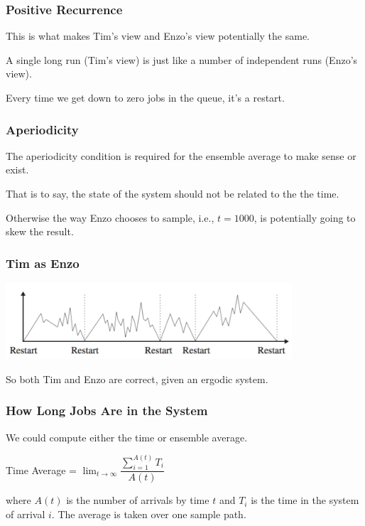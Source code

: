 \begin{frame}
\frametitle{Positive Recurrence}

This is what makes Tim's view and Enzo's view potentially the same. 

A single long run (Tim's view) is just like a number of independent runs (Enzo's view). 

Every time we get down to zero jobs in the queue, it's a restart. 

\end{frame}



\begin{frame}
\frametitle{Aperiodicity}

The \alert{aperiodicity} condition is required for the ensemble average to make sense or exist. 

That is to say, the state of the system should not be related to the the time.

Otherwise the way Enzo chooses to sample, i.e., $t = 1000$, is potentially going to skew the result.

\end{frame}



\begin{frame}
\frametitle{Tim as Enzo}

\begin{center}
	\includegraphics[width=0.8\textwidth]{images/systemrestart.png}
\end{center}

So both Tim and Enzo are correct, given an ergodic system.


\end{frame}



\begin{frame}
\frametitle{How Long Jobs Are in the System}

We could compute either the time or ensemble average. 

\begin{center}
	Time Average = $\lim_{t\to\infty}\dfrac{\sum_{i=1}^{A(t)} T_{i}}{A(t)}$
\end{center}

where $A(t)$ is the number of arrivals by time $t$ and $T_{i}$ is the time in the system of arrival $i$. The average is taken over one sample path.


\end{frame}

